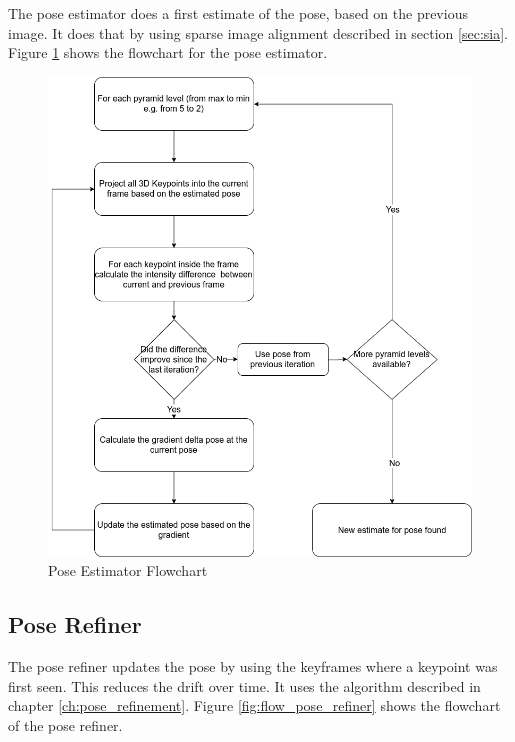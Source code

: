 \documentclass[11pt,a4paper,titlepage,oneside]{report}
\begin{document}
The pose estimator does a first estimate of the pose, based on the previous image. It does that by using sparse image alignment described in section \ref{sec:sia}. Figure \ref{fig:flow_pose_estimator} shows the flowchart for the pose estimator.

\begin{figure}[H]
  \centering
  \includegraphics[scale=0.3]{img/flow_pose_estimator.png}
  \caption{Pose Estimator Flowchart}\label{fig:flow_pose_estimator}
\end{figure}

\subsection{Pose Refiner}

The pose refiner updates the pose by using the keyframes where a keypoint was first seen. This reduces the drift over time. It uses the algorithm described in chapter \ref{ch:pose_refinement}. Figure \ref{fig:flow_pose_refiner} shows the flowchart of the pose refiner.
\end{document}
